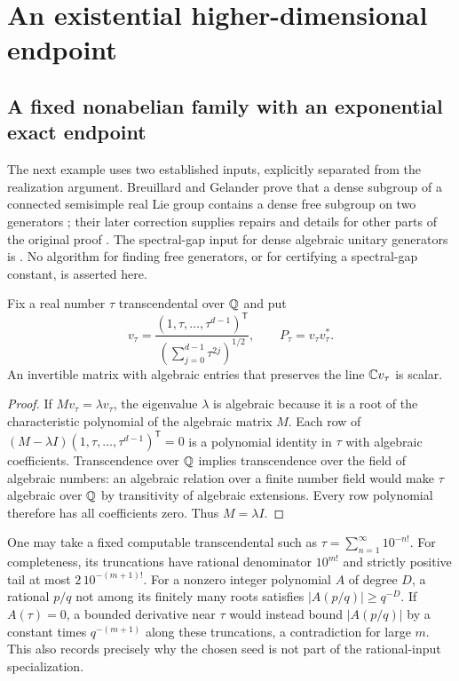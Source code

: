 \section{An existential higher-dimensional endpoint}
\subsection{A fixed nonabelian family with an exponential exact endpoint}
The next example uses two established inputs, explicitly separated from
the realization argument. Breuillard and Gelander prove that a dense
subgroup of a connected semisimple real Lie group contains a dense free
subgroup on two generators \cite[Theorem~1.1]{BreuillardGelander57}; their
later correction supplies repairs and details for other parts of the
original proof \cite{BreuillardGelanderCorrection57}. The spectral-gap input
for dense algebraic unitary generators is \cite{BG2012}. No algorithm for
finding free generators, or for certifying a spectral-gap constant, is
asserted here.

\begin{lemma}
\label{lem:transcendentalseed57}
Fix a real number $\tau$ transcendental over $\mathbb Q$ and put
\[
 v_\tau=\frac{(1,\tau,\ldots,\tau^{d-1})^{\mathsf T}}
                  {(\sum_{j=0}^{d-1}\tau^{2j})^{1/2}},\qquad
 P_\tau=v_\tau v_\tau^*.
\]
An invertible matrix with algebraic entries that preserves the line
$\mathbb C v_\tau$ is scalar.
\end{lemma}
\begin{proof}
If $Mv_\tau=\lambda v_\tau$, the eigenvalue $\lambda$ is algebraic because
it is a root of the characteristic polynomial of the algebraic matrix $M$.
Each row of $(M-\lambda I)(1,\tau,\ldots,\tau^{d-1})^{\mathsf T}=0$ is a
polynomial identity in $\tau$ with algebraic coefficients. Transcendence
over $\mathbb Q$ implies transcendence over the field of algebraic numbers: an
algebraic relation over a finite number field would make $\tau$ algebraic
over $\mathbb Q$ by transitivity of algebraic extensions. Every row polynomial
therefore has all coefficients zero. Thus $M=\lambda I$.
\end{proof}
One may take a fixed computable transcendental such as
$\tau=\sum_{n=1}^\infty10^{-n!}$. For completeness, its truncations have
rational denominator $10^{m!}$ and strictly positive tail at most
$2\,10^{-(m+1)!}$. For a nonzero integer polynomial $A$ of degree $D$, a
rational $p/q$ not among its finitely many roots satisfies
$|A(p/q)|\ge q^{-D}$. If $A(\tau)=0$, a bounded derivative near $\tau$
would instead bound $|A(p/q)|$ by a constant times $q^{-(m+1)}$ along these
truncations, a contradiction for large $m$. This also records precisely
why the chosen seed is not part of the rational-input specialization.

